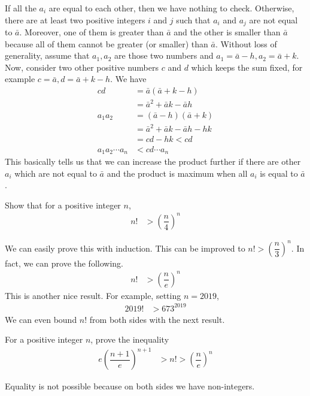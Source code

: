\documentclass{subfile}
\begin{document}
	If all the $a_i$ are equal to each other, then we have nothing to check. Otherwise, there are at least two positive integers $i$ and $j$ such that $a_i$ and $a_j$ are not equal to $\bar{a}$. Moreover, one of them is greater than $\bar{a}$ and the other is smaller than $\bar{a}$ because all of them cannot be greater (or smaller) than $\bar{a}$. Without loss of generality, assume that $a_1,a_2$ are those two numbers and $a_1=\bar{a}-h,a_2=\bar{a}+k$. Now, consider two other positive numbers $c$ and $d$ which keeps the sum fixed, for example $c=\bar{a},d=\bar{a}+k-h$. We have
		\begin{align*}
			cd
				& = \bar{a}(\bar{a}+k-h)\\
				& = \bar{a}^2+\bar{a}k-\bar{a}h\\
			a_1a_2
				& = (\bar{a}-h)(\bar{a}+k)\\
				& = \bar{a}^2+\bar{a}k-\bar{a}h-hk\\
				& = cd-hk < cd\\
			a_1a_2\cdots a_n
				& < cd\cdots a_n
		\end{align*}
	This basically tells us that we can increase the product further if there are other $a_i$ which are not equal to $\bar{a}$ and the product is maximum when all $a_i$ is equal to $\bar{a}$.
		\begin{problem}
			Show that for a positive integer $n$,
				\begin{align*}
					n!
						& > \left(\dfrac{n}{4}\right)^n
				\end{align*}
		\end{problem}
	We can easily prove this with induction. This can be improved to $n!>\left(\dfrac{n}{3}\right)^n$. In fact, we can prove the following.
		\begin{align*}
			n!
				& > \left(\dfrac{n}{e}\right)^n
		\end{align*}
	This is another nice result. For example, setting $n=2019$,
		\begin{align*}
			2019!
				& > 673^{2019}
		\end{align*}
	We can even bound $n!$ from both sides with the next result.
		\begin{problem}
			For a positive integer $n$, prove the inequality
				\begin{align*}
					e\left(\dfrac{n+1}{e}\right)^{n+1}
						& > n!>\left(\dfrac{n}{e}\right)^n
				\end{align*}
		\end{problem}
	Equality is not possible because on both sides we have non-integers.
\end{document}
